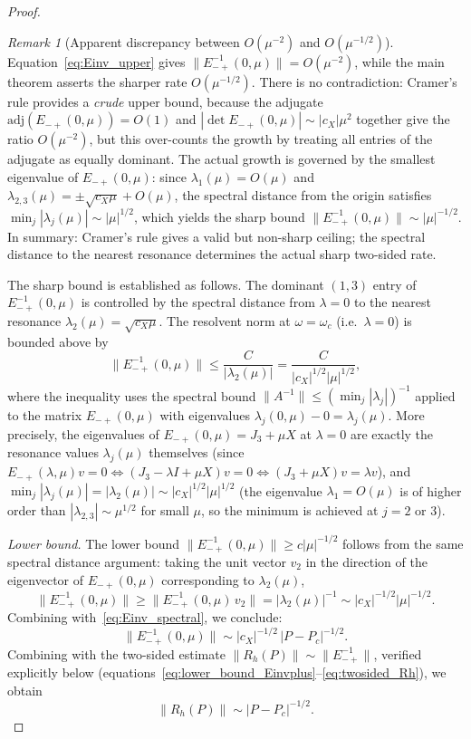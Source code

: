 \documentclass[12pt,a4paper]{amsart}
\theoremstyle{remark}
\newtheorem{remark}[theorem]{Remark}
\begin{document}
\begin{proof}
\begin{remark}[Apparent discrepancy between $O(\mu^{-2})$ and $O(\mu^{-1/2})$]
\label{rem:discrepancy}
Equation~\eqref{eq:Einv_upper} gives $\|E_{-+}^{-1}(0,\mu)\| = O(\mu^{-2})$,
while the main theorem asserts the sharper rate $O(\mu^{-1/2})$.
There is no contradiction: Cramer's rule provides a \emph{crude} upper bound,
because the adjugate $\mathrm{adj}(E_{-+}(0,\mu)) = O(1)$ and
$|\det E_{-+}(0,\mu)| \sim |c_X|\mu^2$ together give the ratio $O(\mu^{-2})$,
but this over-counts the growth by treating all entries of the adjugate
as equally dominant.
The actual growth is governed by the smallest eigenvalue of $E_{-+}(0,\mu)$:
since $\lambda_1(\mu) = O(\mu)$ and $\lambda_{2,3}(\mu) = \pm\sqrt{c_X\mu} + O(\mu)$,
the spectral distance from the origin satisfies
$\min_j|\lambda_j(\mu)| \sim |\mu|^{1/2}$, which yields the sharp bound
$\|E_{-+}^{-1}(0,\mu)\| \sim |\mu|^{-1/2}$.
In summary: Cramer's rule gives a valid but non-sharp ceiling; the spectral
distance to the nearest resonance determines the actual sharp two-sided rate.
\end{remark}

The sharp bound is established as follows.
The dominant $(1,3)$ entry of $E_{-+}^{-1}(0,\mu)$ is controlled by the
spectral distance from $\lambda = 0$ to the nearest resonance
$\lambda_2(\mu) = \sqrt{c_X\mu}$.
The resolvent norm at $\omega = \omega_c$ (i.e.\ $\lambda = 0$) is bounded above by
\begin{equation}\label{eq:Einv_spectral}
  \|E_{-+}^{-1}(0,\mu)\| \leq \frac{C}{|\lambda_2(\mu)|}
  = \frac{C}{|c_X|^{1/2}|\mu|^{1/2}},
\end{equation}
where the inequality uses the spectral bound
$\|A^{-1}\| \leq (\min_j |\lambda_j|)^{-1}$ applied to the matrix $E_{-+}(0,\mu)$
with eigenvalues $\lambda_j(0,\mu) - 0 = \lambda_j(\mu)$.
More precisely, the eigenvalues of $E_{-+}(0,\mu) = J_3 + \mu X$ at $\lambda = 0$
are exactly the resonance values $\lambda_j(\mu)$ themselves
(since $E_{-+}(\lambda,\mu)v = 0 \Leftrightarrow (J_3 - \lambda I + \mu X)v = 0 \Leftrightarrow (J_3 + \mu X)v = \lambda v$),
and $\min_j|\lambda_j(\mu)| = |\lambda_{2}(\mu)| \sim |c_X|^{1/2}|\mu|^{1/2}$
(the eigenvalue $\lambda_1 = O(\mu)$ is of higher order than $|\lambda_{2,3}| \sim \mu^{1/2}$
for small $\mu$, so the minimum is achieved at $j = 2$ or $3$).

\emph{Lower bound.}
The lower bound $\|E_{-+}^{-1}(0,\mu)\| \geq c|\mu|^{-1/2}$ follows from the same
spectral distance argument: taking the unit vector $v_2$ in the direction of the eigenvector
of $E_{-+}(0,\mu)$ corresponding to $\lambda_2(\mu)$,
\[
  \|E_{-+}^{-1}(0,\mu)\| \geq \|E_{-+}^{-1}(0,\mu)\,v_2\|
  = |\lambda_2(\mu)|^{-1} \sim |c_X|^{-1/2}|\mu|^{-1/2}.
\]
Combining with~\eqref{eq:Einv_spectral}, we conclude:
\[
  \|E_{-+}^{-1}(0,\mu)\| \sim |c_X|^{-1/2}\,|P - P_c|^{-1/2}.
\]
Combining with the two-sided estimate $\|R_h(P)\| \sim \|E_{-+}^{-1}\|$,
verified explicitly below (equations~\eqref{eq:lower_bound_Einvplus}--\eqref{eq:twosided_Rh}), we obtain
\[
  \|R_h(P)\| \sim |P-P_c|^{-1/2}.
\]


\end{proof}
\end{document}
